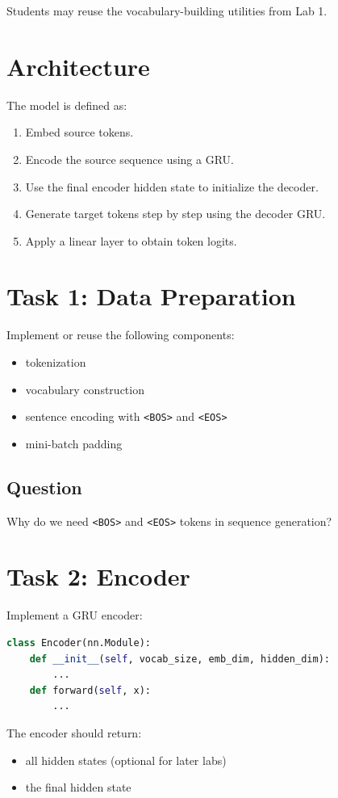 \documentclass[12pt]{article}
\begin{document}
Students may reuse the vocabulary-building utilities from Lab 1.

\section{Architecture}
The model is defined as:
\begin{enumerate}
    \item Embed source tokens.
    \item Encode the source sequence using a GRU.
    \item Use the final encoder hidden state to initialize the decoder.
    \item Generate target tokens step by step using the decoder GRU.
    \item Apply a linear layer to obtain token logits.
\end{enumerate}

\section{Task 1: Data Preparation}
Implement or reuse the following components:
\begin{itemize}
    \item tokenization
    \item vocabulary construction
    \item sentence encoding with \texttt{<BOS>} and \texttt{<EOS>}
    \item mini-batch padding
\end{itemize}

\subsection*{Question}
Why do we need \texttt{<BOS>} and \texttt{<EOS>} tokens in sequence generation?

\section{Task 2: Encoder}
Implement a GRU encoder:

\begin{lstlisting}[language=Python]
class Encoder(nn.Module):
    def __init__(self, vocab_size, emb_dim, hidden_dim):
        ...
    def forward(self, x):
        ...
\end{lstlisting}

The encoder should return:
\begin{itemize}
    \item all hidden states (optional for later labs)
    \item the final hidden state
\end{itemize}
\end{document}
